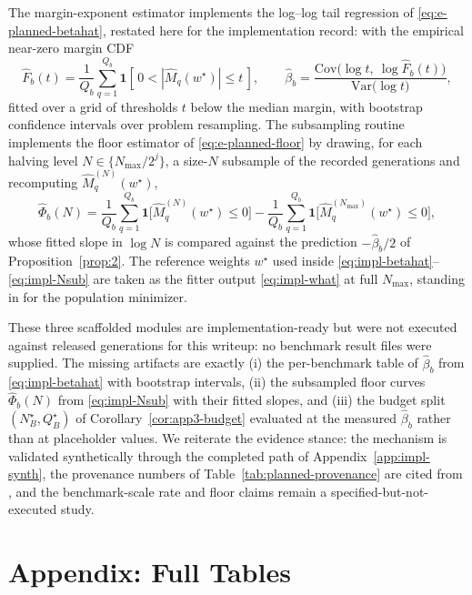 \documentclass{article} %
\providecommand{\Mhat}{\widehat{M}}
\providecommand{\wstar}{w^{\star}}
\begin{document}
The margin-exponent estimator implements the log--log tail regression of
\eqref{eq:e-planned-betahat}, restated here for the implementation record: with
the empirical near-zero margin CDF
\begin{equation}
\label{eq:impl-betahat}
\widehat{F}_b(t)=\frac1{Q_b}\sum_{q=1}^{Q_b}
\mathbf 1\!\left[\,0<|\Mhat_q(\wstar)|\le t\,\right],
\qquad
\widehat\beta_b
=
\frac{\mathrm{Cov}\big(\log t,\ \log \widehat{F}_b(t)\big)}
{\mathrm{Var}\big(\log t\big)},
\end{equation}
fitted over a grid of thresholds $t$ below the median margin, with
bootstrap confidence intervals over problem resampling.  The subsampling
routine implements the floor estimator of \eqref{eq:e-planned-floor} by drawing,
for each halving level $N\in\{N_{\max}/2^j\}$, a size-$N$ subsample of the
recorded generations and recomputing $\Mhat_q^{(N)}(\wstar)$,
\begin{equation}
\label{eq:impl-Nsub}
\widehat\Phi_b(N)=
\frac1{Q_b}\sum_{q=1}^{Q_b}
\mathbf 1\!\big[\Mhat_q^{(N)}(\wstar)\le 0\big]
-
\frac1{Q_b}\sum_{q=1}^{Q_b}
\mathbf 1\!\big[\Mhat_q^{(N_{\max})}(\wstar)\le 0\big],
\end{equation}
whose fitted slope in $\log N$ is compared against the prediction
$-\widehat\beta_b/2$ of Proposition~\ref{prop:2}.  The reference weights
$\wstar$ used inside \eqref{eq:impl-betahat}--\eqref{eq:impl-Nsub} are taken as
the fitter output \eqref{eq:impl-what} at full $N_{\max}$, standing in for the
population minimizer.

These three scaffolded modules are implementation-ready but were not executed
against released generations for this writeup: no benchmark result files were
supplied.  The missing artifacts are exactly (i) the per-benchmark table of
$\widehat\beta_b$ from \eqref{eq:impl-betahat} with bootstrap intervals,
(ii) the subsampled floor curves $\widehat\Phi_b(N)$ from \eqref{eq:impl-Nsub}
with their fitted slopes, and (iii) the budget split
$(N_B^\star,Q_B^\star)$ of Corollary~\ref{cor:app3-budget} evaluated at the
measured $\widehat\beta_b$ rather than at placeholder values.  We reiterate the
evidence stance: the mechanism is validated synthetically through the completed
path of Appendix~\ref{app:impl-synth}, the provenance numbers of
Table~\ref{tab:planned-provenance} are cited from \cite{komiyama2026best}, and
the benchmark-scale rate and floor claims remain a specified-but-not-executed
study.


\section{Appendix: Full Tables}
\label{app:tables}
\end{document}

